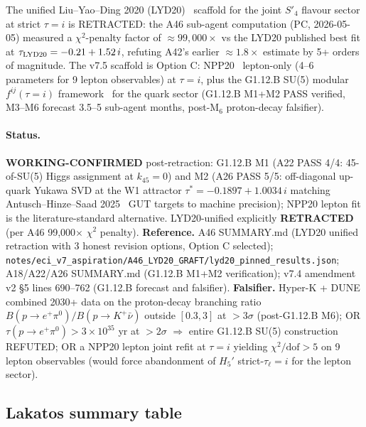 \begin{axiom*}[$H_{11}'$, Option C: NPP20 lepton at $\tau=i$ + G1.12.B SU(5) for quark; explicit retraction of LYD20 unified scaffold (NEW v7.5)]
The unified Liu--Yao--Ding 2020 (LYD20)~\cite{LYD20} scaffold for the
joint $S'_4$ flavour sector at strict $\tau = i$ is RETRACTED: the
A46 sub-agent computation (PC, 2026-05-05) measured a
$\chi^2$-penalty factor of $\approx 99{,}000\times$ vs the LYD20
published best fit at $\tau_{\rm LYD20} = -0.21 + 1.52\,i$, refuting
A42's earlier $\approx 1.8\times$ estimate by 5+ orders of magnitude.
The v7.5 scaffold is Option C: NPP20~\cite{NPP20} lepton-only
(4--6 parameters for 9 lepton observables) at $\tau = i$, plus the
G1.12.B SU(5) modular $f^{ij}(\tau = i)$ framework~\cite{A18scoping}
for the quark sector (G1.12.B M1+M2 PASS verified, M3--M6 forecast
3.5--5 sub-agent months, post-M$_6$ proton-decay falsifier).
\end{axiom*}

\paragraph{Status.}  \textbf{WORKING-CONFIRMED} post-retraction:
G1.12.B M1 (A22 PASS 4/4: 45-of-SU(5) Higgs assignment at $k_{45}=0$)
and M2 (A26 PASS 5/5: off-diagonal up-quark Yukawa SVD at the W1
attractor $\tau^* = -0.1897 + 1.0034\,i$ matching Antusch--Hinze--Saad
2025~\cite{AHS25} GUT targets to machine precision); NPP20 lepton fit
is the literature-standard alternative.  LYD20-unified explicitly
\textbf{RETRACTED} (per A46 99{,}000$\times$ $\chi^2$ penalty).
\textbf{Reference.}  A46 SUMMARY.md (LYD20 unified retraction with
3 honest revision options, Option C selected);
\texttt{notes/eci\_v7\_aspiration/A46\_LYD20\_GRAFT/lyd20\_pinned\_results.json};
A18/A22/A26 SUMMARY.md (G1.12.B M1+M2 verification);
v7.4 amendment v2 \S 5 lines 690--762 (G1.12.B forecast and falsifier).
\textbf{Falsifier.}  Hyper-K + DUNE combined 2030+ data on the
proton-decay branching ratio
$B(p\to e^+\pi^0)/B(p\to K^+\bar\nu)$ outside $[0.3, 3]$ at $> 3\sigma$
(post-G1.12.B M6); OR $\tau(p\to e^+\pi^0) > 3 \times 10^{35}$ yr at
$> 2\sigma$ $\Rightarrow$ entire G1.12.B SU(5) construction REFUTED;
OR a NPP20 lepton joint refit at $\tau = i$ yielding
$\chi^2/\mathrm{dof} > 5$ on 9 lepton observables (would force
abandonment of $H_5'$ strict-$\tau_\ell = i$ for the lepton sector).

\subsection{Lakatos summary table}
\label{sec:axioms-lakatos}

